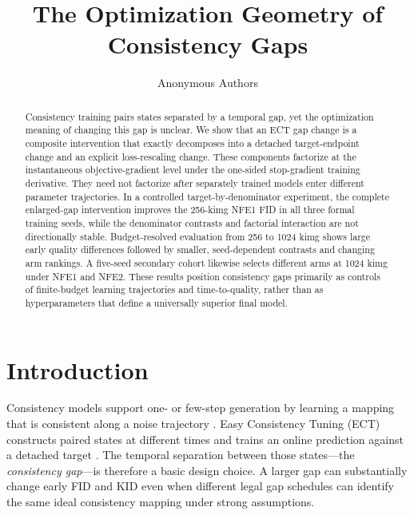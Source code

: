 \documentclass{article}
\title{The Optimization Geometry of Consistency Gaps}
\author{Anonymous Authors}
\newif\ifshowcomments
\newcommand{\todo}[1]{%
  \ifshowcomments{\color{todored}\textbf{[TODO: #1]}}\fi}
\begin{document}
\maketitle

\begin{abstract}
Consistency training pairs states separated by a temporal gap, yet the
optimization meaning of changing this gap is unclear. We show that an ECT gap
change is a composite intervention that exactly decomposes into a detached
target-endpoint change and an explicit loss-rescaling change. These components
factorize at the instantaneous objective-gradient level under the one-sided
stop-gradient training derivative. They need not factorize after separately
trained models enter different parameter trajectories. In a controlled
target-by-denominator experiment, the complete enlarged-gap intervention
improves the 256-kimg NFE1 FID in all three formal training seeds, while the
denominator contrasts and factorial interaction are not directionally stable.
Budget-resolved evaluation from 256 to 1024 kimg shows large early quality
differences followed by smaller, seed-dependent contrasts and changing arm
rankings. A five-seed secondary cohort likewise selects different arms at 1024
kimg under NFE1 and NFE2. These results position consistency gaps primarily as
controls of finite-budget learning trajectories and time-to-quality, rather
than as hyperparameters that define a universally superior final model.
\end{abstract}

\todo{Abstract: re-check wording after the prospectively unseen cohort is
complete; do not replace the current evidence status before unblinding.}

\section{Introduction}
\label{sec:introduction}

Consistency models support one- or few-step generation by learning a mapping
that is consistent along a noise trajectory \citep{song2023consistency}.
Easy Consistency Tuning (ECT) constructs paired states at different times and
trains an online prediction against a detached target
\citep{geng2024consistency}. The temporal separation between those states---the
\emph{consistency gap}---is therefore a basic design choice. A larger gap can
substantially change early FID and KID even when different legal gap schedules
can identify the same ideal consistency mapping under strong assumptions.
\end{document}

